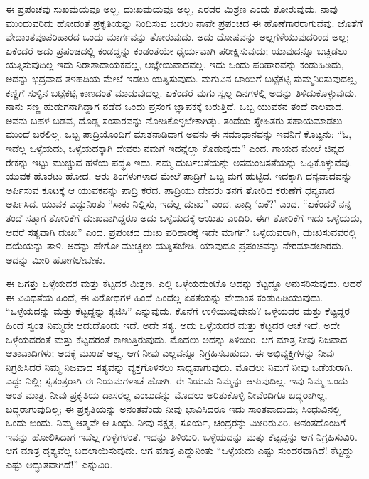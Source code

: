 \vskip 0.2cm 

ಈ ಪ್ರಪಂಚವು ಸುಖಮಯವೂ ಅಲ್ಲ, ದುಃಖಮಯವೂ ಅಲ್ಲ, ಎರಡರ ಮಿಶ್ರಣ ಎಂದು ತೋರುವುದು. ನಾವು ಮುಂದುವರಿದು ಹೋದಂತೆ ಪ್ರಕೃತಿಯನ್ನು ನಿಂದಿಸುವ ಬದಲು ನಾವೇ ಪ್ರಪಂಚದ ಈ ಹೊಣೆಗಾರರಾಗುವೆವು. ಜೊತೆಗೆ ವೇದಾಂತವೂ\break ಪರಿಹಾರದ ಒಂದು ಮಾರ್ಗವನ್ನು ತೋರುವುದು. ಅದು ದೋಷವನ್ನು ಅಲ್ಲಗಳೆಯುವುದರಿಂದ ಅಲ್ಲ; ಏಕೆಂದರೆ ಅದು ಪ್ರಪಂಚದಲ್ಲಿ ಕಂಡದ್ದನ್ನು ಕಂಡಂತೆಯೇ ಧೈರ್ಯವಾಗಿ ಪರೀಕ್ಷಿಸುವುದು; ಯಾವುದನ್ನೂ ಬಚ್ಚಿಡಲು ಯತ್ನಿಸುವುದಿಲ್ಲ ಇದು ನಿರಾಶಾದಾಯಕವಲ್ಲ, ಆಜ್ಞೇಯವಾದವಲ್ಲ. ಇದು ಒಂದು ಪರಿಹಾರವನ್ನು ಕಂಡುಹಿಡಿದು, ಅದನ್ನು ಭದ್ರವಾದ ತಳಹದಿಯ ಮೇಲೆ ಇಡಲು ಯತ್ನಿಸುವುದು. ಮಗುವಿನ ಬಾಯಿಗೆ ಬಟ್ಟೆಕಟ್ಟಿ ಸುಮ್ಮನಿರಿಸುವುದಲ್ಲ, ಕಣ್ಣಿಗೆ ಸುಳ್ಳಿನ ಬಟ್ಟೆಕಟ್ಟಿ ಕಾಣದಂತೆ ಮಾಡುವುದಲ್ಲ. ಏಕೆಂದರೆ ಮಗು ಸ್ವಲ್ಪ ದಿನಗಳಲ್ಲಿ ಅದನ್ನು ತಿಳಿದುಕೊಳ್ಳುವುದು. ನಾನು ಸಣ್ಣ ಹುಡುಗನಾಗಿದ್ದಾಗ ನಡೆದ ಒಂದು ಪ್ರಸಂಗ ಜ್ಞಾಪಕಕ್ಕೆ ಬರುತ್ತಿದೆ. ಒಬ್ಬ ಯುವಕನ ತಂದೆ ಕಾಲವಾದ. ಅವನು ಬಹಳ ಬಡವ, ದೊಡ್ಡ ಸಂಸಾರವನ್ನು ನೋಡಿಕೊಳ್ಳಬೇಕಾಗಿತ್ತು. ತಂದೆಯ ಸ್ನೇಹಿತರು ಸಹಾಯಮಾಡಲು ಮುಂದೆ ಬರಲಿಲ್ಲ. ಒಬ್ಬ ಪಾದ್ರಿಯೊಂದಿಗೆ ಮಾತನಾಡಿದಾಗ ಅವನು ಈ ಸಮಾಧಾನವನ್ನು ಇವನಿಗೆ ಕೊಟ್ಟನು: “ಓ, ಇದೆಲ್ಲ ಒಳ್ಳೆಯದು, ಒಳ್ಳೆಯದಕ್ಕಾಗಿ ದೇವರು ನಮಗೆ ಇದನ್ನೆಲ್ಲಾ ಕೊಡುವುದು” ಎಂದ. ಗಾಯದ ಮೇಲೆ ಚಿನ್ನದ ರೇಕನ್ನು ಇಟ್ಟು ಮುಚ್ಚುವ ಹಳೆಯ ಪದ್ಧತಿ ಇದು. ನಮ್ಮ ದುರ್ಬಲತೆಯನ್ನು ಅಸಮಂಜಸತೆಯನ್ನು ಒಪ್ಪಿಕೊಳ್ಳುವೆವು. ಯುವಕ ಹೊರಟು ಹೋದ. ಆರು ತಿಂಗಳುಗಳಾದ ಮೇಲೆ ಪಾದ್ರಿಗೆ ಒಬ್ಬ ಮಗ ಹುಟ್ಟಿದ. ಇದಕ್ಕಾಗಿ ಧನ್ಯವಾದವನ್ನು ಅರ್ಪಿಸುವ ಕೂಟಕ್ಕೆ ಆ ಯುವಕನನ್ನು ಪಾದ್ರಿ ಕರೆದ. ಪಾದ್ರಿಯು ದೇವರು ತನಗೆ ತೋರಿದ ಕರುಣೆಗೆ ಧನ್ಯವಾದ ಅರ್ಪಿಸಿದ. ಯುವಕ ಎದ್ದುನಿಂತು “ಸಾಕು ನಿಲ್ಲಿಸು, ಇದೆಲ್ಲ ದುಃಖ” ಎಂದ. ಪಾದ್ರಿ ‘ಏಕೆ?’ ಎಂದ. “ಏಕೆಂದರೆ ನನ್ನ ತಂದೆ ಸತ್ತಾಗ ತೋರಿಕೆಗೆ ದುಃಖವಾಗಿದ್ದರೂ ಅದು ಒಳ್ಳೆಯದಕ್ಕೆ ಆಯಿತು ಎಂದಿರಿ. ಈಗ ತೋರಿಕೆಗೆ ಇದು ಒಳ್ಳೆಯದು, ಆದರೆ ಸತ್ಯವಾಗಿ ದುಃಖ” ಎಂದ. ಪ್ರಪಂಚದ ದುಃಖ ಪರಿಹಾರಕ್ಕೆ ಇದೇ ಮಾರ್ಗ? ಒಳ್ಳೆಯವರಾಗಿ, ದುಃಖಿಸುವವರಲ್ಲಿ ದಯೆಯನ್ನು ತಾಳಿ. ಅದನ್ನು ಹೇಗೋ ಮುಚ್ಚಲು ಯತ್ನಿಸಬೇಡಿ. ಯಾವುದೂ ಪ್ರಪಂಚವನ್ನು ನೇರಮಾಡಲಾರದು. ಅದನ್ನು ಮೀರಿ ಹೋಗಲೇಬೇಕು.



ಈ ಜಗತ್ತು ಒಳ್ಳೆಯದರ ಮತ್ತು ಕೆಟ್ಟದರ ಮಿಶ್ರಣ. ಎಲ್ಲಿ ಒಳ್ಳೆಯದುಂಟೊ ಅದನ್ನು ಕೆಟ್ಟದ್ದೂ ಅನುಸರಿಸುವುದು. ಆದರೆ ಈ ವಿವಿಧತೆಯ ಹಿಂದೆ, ಈ ವಿರೋಧಗಳ ಹಿಂದೆ ಹಿಂದೆಲ್ಲ ಏಕತೆಯನ್ನು ವೇದಾಂತ ಕಂಡುಹಿಡಿಯುವುದು. “ಒಳ್ಳೆಯದನ್ನು ಮತ್ತು ಕೆಟ್ಟದ್ದನ್ನು ತ್ಯಜಿಸಿ” ಎನ್ನುವುದು. ಕೊನೆಗೆ ಉಳಿಯುವುದೇನು? ಒಳ್ಳೆಯದರ ಮತ್ತು ಕೆಟ್ಟದ್ದರ ಹಿಂದೆ ಸ್ವಂತ ನಿಮ್ಮದೇ ಆದುದೊಂದು ಇದೆ. ಅದೇ ಸತ್ಯ. ಅದು ಒಳ್ಳೆಯದರ ಮತ್ತು ಕೆಟ್ಟದರ ಆಚೆ ಇದೆ. ಅದೇ ಒಳ್ಳೆಯದರಂತೆ ಮತ್ತು ಕೆಟ್ಟದರಂತೆ ಕಾಣುತ್ತಿರುವುದು. ಮೊದಲು ಅದನ್ನು ತಿಳಿಯಿರಿ. ಆಗ ಮಾತ್ರ ನೀವು ನಿಜವಾದ ಆಶಾವಾದಿಗಳು; ಅದಕ್ಕೆ ಮುಂಚೆ ಅಲ್ಲ. ಆಗ ನೀವು ಎಲ್ಲವನ್ನೂ ನಿಗ್ರಹಿಸಬಹುದು. ಈ ಅಭಿವ್ಯಕ್ತಿಗಳನ್ನು ನೀವು ನಿಗ್ರಹಿಸಿದರೆ ನಿಮ್ಮ ನಿಜವಾದ ಸತ್ಯವನ್ನು ವ್ಯಕ್ತಗೊಳಿಸಲು ಸಾಧ್ಯವಾಗುವುದು. ಮೊದಲು ನಿಮಗೆ ನೀವು ಒಡೆಯರಾಗಿ. ಎದ್ದು ನಿಲ್ಲಿ; ಸ್ವತಂತ್ರರಾಗಿ ಈ ನಿಯಮಗಳಾಚೆ ಹೋಗಿ. ಈ ನಿಯಮ ನಿಮ್ಮನ್ನು ಆಳುವುದಿಲ್ಲ. ಇವು ನಿಮ್ಮ ಒಂದು ಅಂಶ ಮಾತ್ರ. ನೀವು ಪ್ರಕೃತಿಯ ದಾಸರಲ್ಲ ಎಂಬುದನ್ನು ಮೊದಲು ಅರಿತುಕೊಳ್ಳಿ ನೀವೆಂದಿಗೂ ಬದ್ಧರಾಗಿಲ್ಲ, ಬದ್ಧರಾಗುವುದಿಲ್ಲ; ಈ ಪ್ರಕೃತಿಯನ್ನು ಅನಂತವೆಂದು ನೀವು ಭಾವಿಸಿದರೂ ಇದು ಸಾಂತವಾದುದು; ಸಿಂಧುವಿನಲ್ಲಿ ಒಂದು ಬಿಂದು. ನಿಮ್ಮ ಆತ್ಮವೇ ಆ ಸಿಂಧು. ನೀವು ನಕ್ಷತ್ರ, ಸೂರ್ಯ, ಚಂದ್ರರನ್ನು ಮೀರಿರುವಿರಿ. ಅನಂತದೊಂದಿಗೆ ಇವನ್ನು ಹೋಲಿಸಿದಾಗ ಇವೆಲ್ಲ ಗುಳ್ಳೆಗಳಂತೆ. ಇದನ್ನು ತಿಳಿಯಿರಿ. ಒಳ್ಳೆಯದನ್ನು ಮತ್ತು ಕೆಟ್ಟದ್ದನ್ನು ಆಗ ನಿಗ್ರಹಿಸುವಿರಿ. ಆಗ ಮಾತ್ರ ದೃಶ್ಯವೆಲ್ಲ ಬದಲಾಯಿಸುವುದು. ಆಗ ಮಾತ್ರ ಎದ್ದುನಿಂತು “ಒಳ್ಳೆಯದು ಎಷ್ಟು ಸುಂದರವಾಗಿದೆ! ಕೆಟ್ಟದ್ದು ಎಷ್ಟು ಅದ್ಭುತವಾಗಿದೆ!” ಎನ್ನುವಿರಿ.

